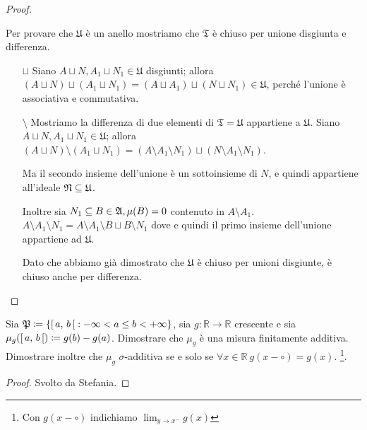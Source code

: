 \documentclass[../EserciziIstituzioniAnalisi.tex]{subfiles}
\begin{document}
\begin{proof}
\begin{enumerate}
\begin{itemize}
      Per provare che $\mathfrak{U}$ è un anello mostriamo che $\mathfrak{T}$ è chiuso per unione disgiunta e differenza.
      \begin{itemize}
        \item[$\sqcup$] Siano $A\sqcup N, A_1\sqcup N_1\in\mathfrak{U}$ disgiunti; allora $(A\sqcup N) \sqcup (A_1\sqcup N_1)= (A \sqcup A_1) \sqcup (N\sqcup N_1)\in\mathfrak{U}$, perché l'unione è associativa e commutativa.
        \item[$\setminus$] Mostriamo la differenza di due elementi di $\mathfrak{T}=\mathfrak{U}$ appartiene a $\mathfrak{U}$. Siano $A\sqcup N, A_1\sqcup N_1\in\mathfrak{U}$; allora $(A\sqcup N) \setminus (A_1\sqcup N_1)=(A\setminus A_1\setminus N_1) \sqcup (N\setminus A_1\setminus N_1)$.

        Ma il secondo insieme dell'unione è un sottoinsieme di $N$, e quindi appartiene all'ideale $\mathfrak N\subseteq \mathfrak{U}$.

        Inoltre sia $N_1\subseteq B\in \mathfrak A, \mu(B)=0$ contenuto in $A\setminus A_1$. $A\setminus A_1\setminus N_1=A\setminus A_1\setminus B \sqcup B\setminus N_1$ dove e quindi il primo insieme dell'unione appartiene ad $\mathfrak{U}$.

        Dato che abbiamo già dimostrato che $\mathfrak{U}$ è chiuso per unioni disgiunte, è chiuso anche per differenza.
      \end{itemize}
    \end{itemize}
  \end{enumerate}
\end{proof}

\begin{exercise}[2016-10-14]
  Sia $\mathfrak P \coloneqq \left\lbrace \left[\,a,\,b\,\right[: -\infty < a \leq b < +\infty\right\rbrace$, sia $g\colon \mathbb{R} \to \mathbb{R}$ crescente e sia $\mu_g(\left[\,a,\,b\,\right[) \coloneqq g(b) - g(a)$.
  Dimostrare che $\mu_g$ è una misura finitamente additiva.
  Dimostrare inoltre che $\mu_g$ $\sigma$-additiva se e solo se $\forall x \in \mathbb{R}\ g(x-\circ) = g(x)$. \footnote{Con $g(x-\circ)$ indichiamo $\lim_{y\to x^{-}}g(x)$}.
\end{exercise}
\begin{proof}
  Svolto da Stefania.
\end{proof}
\end{document}
